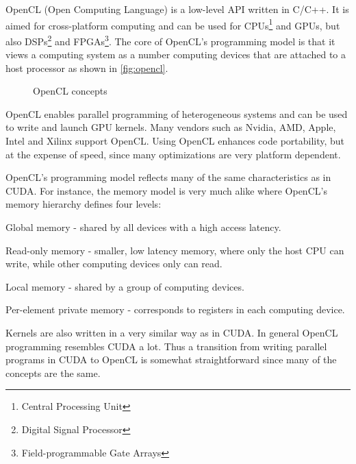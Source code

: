 OpenCL (Open Computing Language) is a low-level API written in C/C++.
It is aimed for cross-platform computing and can be used for CPUs\footnote{Central Processing Unit} and GPUs, but also DSPs\footnote{Digital Signal Processor} and FPGAs\footnote{Field-programmable Gate Arrays}.
The core of OpenCL's programming model is that it views a computing system as a number computing devices that are attached to a host processor as shown in \autoref{fig:opencl}.

\begin{figure}
	\centering
	\caption{OpenCL concepts} 
	\label{fig:opencl}
\end{figure}

OpenCL enables parallel programming of heterogeneous systems and can be used to write and launch GPU kernels.
Many vendors such as Nvidia, AMD, Apple, Intel and Xilinx support OpenCL.
Using OpenCL enhances code portability, but at the expense of speed, since many optimizations are very platform dependent.

OpenCL's programming model reflects many of the same characteristics as in CUDA.
For instance, the memory model is very much alike where OpenCL's memory hierarchy defines four levels:
\begin{itemizeSmall}
	\item Global memory - shared by all devices with a high access latency.
	\item Read-only memory - smaller, low latency memory, where only the host CPU can write, while other computing devices only can read.
	\item Local memory - shared by a group of computing devices.
	\item Per-element private memory - corresponds to registers in each computing device.
\end{itemizeSmall}
Kernels are also written in a very similar way as in CUDA.
In general OpenCL programming resembles CUDA a lot.
Thus a transition from writing parallel programs in CUDA to OpenCL is somewhat straightforward since many of the concepts are the same.